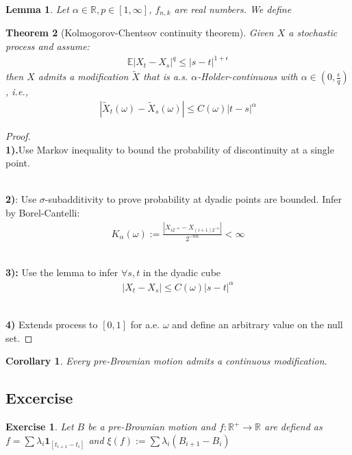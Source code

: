 \documentclass[a4paper,11pt]{book}
\newtheorem{theorem}{Theorem}[section]
\newtheorem{corollary}{Corollary}[theorem]
\newtheorem{lemma}[theorem]{Lemma}
\newtheorem{exercise}{Exercise}[subsection]
\theoremstyle{definition}
\theoremstyle{remark}
\begin{document}
\begin{lemma}
	Let $\alpha \in \mathbb{R}, p \in [1, \infty]$, $f_{n, k}$ are real numbers. We define
\end{lemma}

\begin{theorem}[Kolmogorov-Chentsov continuity theorem]
Given $X$ a stochastic process and assume:
\begin{align*}
	\mathbb{E} | X_t - X_s|^q \le |s - t|^{ 1 + \epsilon}
\end{align*}
then $X$ admits a modification $\tilde{X}$ that is a.s. $\alpha$-Holder-continuous with $\alpha \in (0, \frac{\epsilon}{q})$ , i.e., 
\begin{align*}
	|\tilde{X}_t(\omega) - \tilde{X}_s(\omega) | \le C(\omega) |t - s|^\alpha 
\end{align*}
\end{theorem}
\begin{proof}\quad\\
\textbf{1).}Use Markov inequality to bound the probability of discontinuity at a single point. 

\quad\\
\textbf{2)}: Use $\sigma$-subadditivity to prove probability at dyadic points are bounded. Infer by Borel-Cantelli:
\begin{align*}
	K_\alpha(\omega):= \frac{|X_{i 2^{-n}} - X_{(i +1) 2^{- n}}|}{2^{-n \alpha}} < \infty
\end{align*}

\quad\\
\textbf{3):} Use the lemma to infer $\forall s, t$ in the dyadic cube
\begin{align*}
	|X_t - X_s| \le C(\omega) |s - t|^\alpha
\end{align*}

\quad\\
\textbf{4)} Extends process to $[0, 1]$ for a.e. $\omega$ and define an arbitrary value on the null set. 
\end{proof}

\begin{corollary}
	Every pre-Brownian motion admits a continuous modification. 
\end{corollary}


\subsection{Excercise}
\begin{exercise}
	Let $B$ be a pre-Brownian motion and $f: \mathbb{R}^+ \rightarrow \mathbb{R}$ are defiend as $f = \sum \lambda_i \textbf{1}_{[t_{i + 1} - t_i]}$ and $\xi(f) := \sum \lambda_i (B_{i +1} - B_i)$
\end{exercise}
\end{document}
